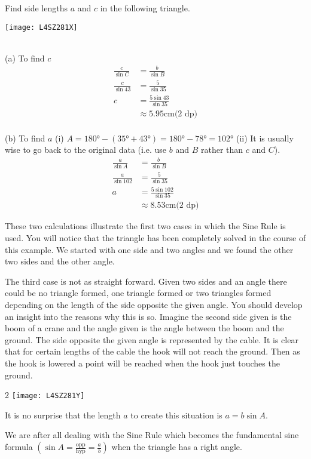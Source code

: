 \begin{multicols}{2}
\example Find side lengths $a$ and $c$ in the following triangle.

\texttt{[image: L4SZ281X]}

\columnbreak
\solution \medskip\\(a) To find $c$
\begin{align*}\frac{c}{\sin  C} &  = \frac{b}{\sin  B} \\
\frac{c}{\sin  43 } &  = \frac{5}{\sin  35 } \\
c &  = \frac{5 \sin  43 }{\sin  35 } \\
&  \approx   5.95 \mbox{cm}\text{(2 dp)}\end{align*} \\

(b) To find $a$ 
(i) $A =\ang{180}  -(\ang{35}  +\ang{43} ) =\ang{180}  -\ang{78}  =\ang{102} $ 
(ii) It is usually wise to go back to the original data (i.e. use $b$ and $B$ rather than $c$ and $C$).
\begin{align*}\frac{a}{\sin  A} &  = \frac{b}{\sin  B} \\
\frac{a}{\sin  102 } &  = \frac{5}{\sin  35 } \\
a &  = \frac{5 \sin  102 }{\sin  35 } \\
&  \approx   8.53 \mbox{cm}\text{(2 dp)}\end{align*}\end{multicols}

These two calculations illustrate the first two cases in which the Sine Rule is used. You will notice that the triangle has been completely solved in the course of this example. We started with one side and two angles and we found the other two sides and the other angle. 

The third case is not as straight forward. Given two sides and an angle there could be no triangle formed, one triangle formed or two triangles formed depending on the length of the side opposite the given angle. You should develop an insight into the reasons why this is so. Imagine the second side given is the boom of a crane and the angle given is the angle between the boom and the ground. The side opposite the given angle is represented by the cable. It is clear that for certain lengths of the cable the hook will not reach the ground. Then as the hook is lowered a point will be reached when the hook just touches the ground.  

\columnsep =30pt
\begin {multicols}{2}
\texttt{[image: L4SZ281Y]}

It is no surprise that the length $a$ to create this situation is $a =b \sin  A\text{.}$ 

We are after all dealing with the Sine Rule which becomes the fundamental sine formula $\left (\sin  A =\frac{\text{opp}}{\text{hyp}} =\frac{a}{b}\right )$ when the triangle has a right angle. 
\end {multicols}

